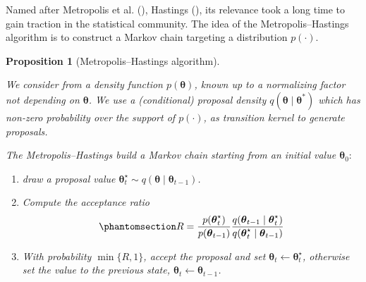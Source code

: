 \documentclass[
  11pt,
  letterpaper,
]{scrbook}
\providecommand{\tightlist}{%
  \setlength{\itemsep}{0pt}\setlength{\parskip}{0pt}}\usepackage{longtable,booktabs,array}
\theoremstyle{definition}
\theoremstyle{plain}
\newtheorem{proposition}{Proposition}[chapter]
\theoremstyle{plain}
\theoremstyle{definition}
\theoremstyle{definition}
\theoremstyle{remark}
\begin{document}
Named after Metropolis et al. (),
Hastings (), its relevance took a long
time to gain traction in the statistical community. The idea of the
Metropolis--Hastings algorithm is to construct a Markov chain targeting
a distribution \(p(\cdot)\).

\begin{proposition}[Metropolis--Hastings
algorithm]\protect\hypertarget{prp-metropolis}{}\label{prp-metropolis}

We consider from a density function \(p(\boldsymbol{\theta})\), known up
to a normalizing factor not depending on \(\boldsymbol{\theta}\). We use
a (conditional) proposal density
\(q(\boldsymbol{\theta} \mid \boldsymbol{\theta}^*)\) which has non-zero
probability over the support of \(p(\cdot)\), as transition kernel to
generate proposals.

The Metropolis--Hastings build a Markov chain starting from an initial
value \(\boldsymbol{\theta}_0:\)

\begin{enumerate}
\def\labelenumi{\arabic{enumi}.}
\tightlist
\item
  draw a proposal value
  \(\boldsymbol{\theta}_t^{\star} \sim q(\boldsymbol{\theta} \mid \boldsymbol{\theta}_{t-1})\).
\item
  Compute the acceptance ratio
  \begin{equation}\phantomsection\label{eq-metropolis-ratio}{
  R = \frac{p(\boldsymbol{\theta}_t^{\star})}{p(\boldsymbol{\theta}_{t-1})}\frac{q(\boldsymbol{\theta}_{t-1} \mid \boldsymbol{\theta}_t^{\star} )}{q(\boldsymbol{\theta}_t^{\star} \mid \boldsymbol{\theta}_{t-1})}
  }\end{equation}
\item
  With probability \(\min\{R, 1\}\), accept the proposal and set
  \(\boldsymbol{\theta}_t \gets \boldsymbol{\theta}_t^{\star}\),
  otherwise set the value to the previous state,
  \(\boldsymbol{\theta}_t \gets \boldsymbol{\theta}_{t-1}\).
\end{enumerate}

\end{proposition}
\end{document}
